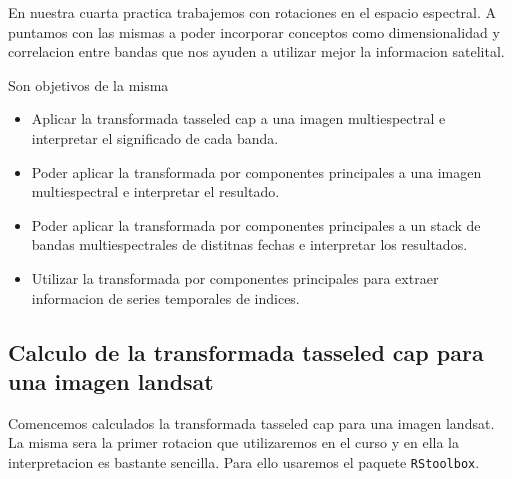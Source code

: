 En nuestra cuarta practica trabajemos con rotaciones en el espacio espectral. A
puntamos con las mismas a poder incorporar conceptos como dimensionalidad y
correlacion entre bandas que nos ayuden a utilizar mejor la informacion
satelital.

Son objetivos de la misma

\begin{itemize}
    \item Aplicar la transformada tasseled cap a una imagen multiespectral e
        interpretar el significado de cada banda.
    \item Poder aplicar la transformada por componentes principales a una imagen
        multiespectral e interpretar el resultado.
    \item Poder aplicar la transformada por componentes principales a un stack
        de bandas multiespectrales de distitnas fechas e interpretar los resultados.
    \item Utilizar la transformada por componentes principales para extraer
        informacion de series temporales de indices.
\end{itemize}

\subsection{Calculo de la transformada tasseled cap para una imagen landsat}

Comencemos calculados la transformada tasseled cap para una imagen landsat. La
misma sera la primer rotacion que utilizaremos en el curso y en ella la
interpretacion es bastante sencilla. Para ello usaremos el paquete
\texttt{RStoolbox}.

